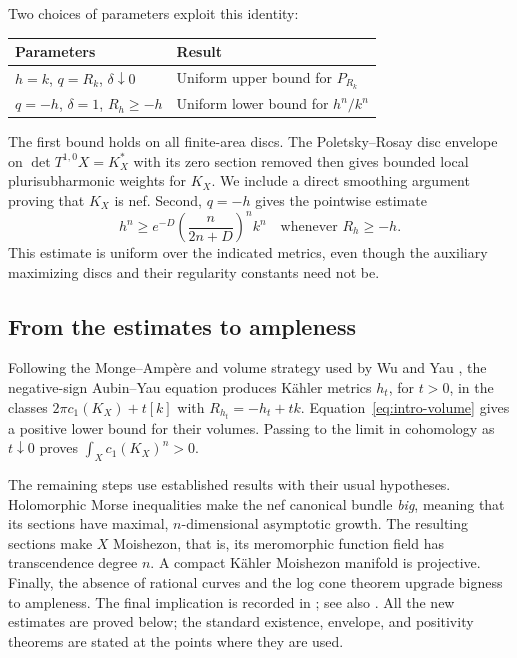 Two choices of parameters exploit this identity:
\begin{center}
\begin{tabular}{@{}ll@{}}
\toprule
Parameters & Result \\
\midrule
$h=k$, $q=R_k$, $\delta\downarrow0$ & Uniform upper bound for $P_{R_k}$ \\
$q=-h$, $\delta=1$, $R_h\ge-h$ & Uniform lower bound for $h^n/k^n$ \\
\bottomrule
\end{tabular}
\end{center}
The first bound holds on all finite-area discs. The
Poletsky--Rosay disc envelope \cite{Poletsky1991,Rosay2003,DrinovecForstneric2012}
on $\det T^{1,0}X=K_X^*$ with its zero section removed then gives
bounded local plurisubharmonic weights for $K_X$. We include a direct
smoothing argument proving that $K_X$ is nef. Second, $q=-h$ gives the
pointwise estimate
\begin{equation}\label{eq:intro-volume}
 h^n\ge e^{-D}\left(\frac{n}{2n+D}\right)^n k^n
 \quad\text{whenever }R_h\ge-h.
\end{equation}
This estimate is uniform over the indicated metrics, even though the
auxiliary maximizing discs and their regularity constants need not be.

\subsection{From the estimates to ampleness}

Following the Monge--Amp\`ere and volume strategy used by Wu and Yau
\cite{WuYau2016}, the negative-sign Aubin--Yau equation produces K\"ahler metrics $h_t$, for $t>0$,
in the classes $2\pi c_1(K_X)+t[k]$ with $R_{h_t}=-h_t+t k$.
Equation~\eqref{eq:intro-volume} gives a positive lower bound for their
volumes. Passing to the limit in cohomology as $t\downarrow0$ proves
$\int_X c_1(K_X)^n>0$.

The remaining steps use established results with their usual
hypotheses. Holomorphic Morse inequalities make the nef canonical
bundle \emph{big}, meaning that its sections have maximal,
$n$-dimensional asymptotic growth. The resulting sections make $X$
Moishezon, that is, its meromorphic function field has transcendence
degree $n$. A compact K\"ahler Moishezon manifold is projective.
Finally, the absence of rational curves and the log cone theorem
upgrade bigness to ampleness. The final implication is recorded in
\cite[Lemma~2.1]{DiverioTrapani2019}; see also
\cite[Lemma~5.1]{Diverio2020}. All the new estimates are proved
below; the standard existence, envelope, and positivity theorems are
stated at the points where they are used.

